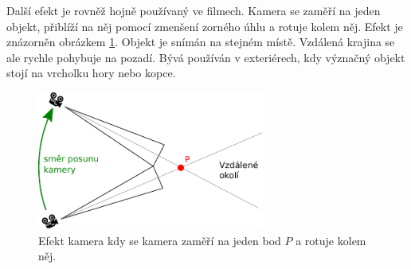 Další efekt je rovněž hojně používaný ve filmech.
Kamera se zaměří na jeden objekt, přiblíží na něj pomocí zmenšení zorného úhlu a rotuje kolem něj.
Efekt je znázorněn obrázkem \ref{fig:kamera1}.
Objekt je snímán na stejném místě.
Vzdálená krajina se ale rychle pohybuje na pozadí.
Bývá používán v exteriérech, kdy význačný objekt stojí na vrcholku hory nebo kopce.
\begin{figure}[h]
\centering
\includegraphics[width=7.5cm,keepaspectratio]{obr/kamera1.pdf}
\caption{Efekt kamera kdy se kamera zaměří na jeden bod $P$ a rotuje kolem něj.}
\label{fig:kamera1}
\end{figure}


